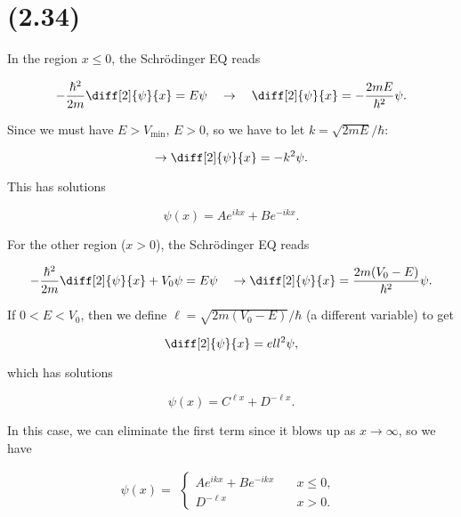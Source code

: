 \section{(2.34)}

\begin{parts}

\item In the region $x\leq0$, the Schr\"odinger EQ reads

\begin{equation*}
    -\frac{\hbar^2}{2m}\diff[2]{\psi}{x} = E\psi \quad \rightarrow \quad \diff[2]{\psi}{x} = -\frac{2mE}{\hbar^2}\psi.
\end{equation*}

Since we must have $E > V_{\mathrm{min}}$, $E>0$, so we have to let $k = \sqrt{2mE}/\hbar$:

\begin{equation*}
    \rightarrow \diff[2]{\psi}{x} = -k^2\psi.
\end{equation*}

This has solutions

\begin{equation}
    \psi(x) = Ae^{ikx} + Be^{-ikx}.
\end{equation}

For the other region ($x>0$), the Schr\"odinger EQ reads

\begin{equation*}
    -\frac{\hbar^2}{2m}\diff[2]{\psi}{x} + V_0\psi = E\psi \quad \rightarrow \diff[2]{\psi}{x} = \frac{2m(V_0 - E)}{\hbar^2}\psi.
\end{equation*}

If $0<E<V_0$, then we define $\ell = \sqrt{2m(V_0 - E)}/\hbar$ (a different variable) to get

\begin{equation*}
    \diff[2]{\psi}{x} = ell^2\psi,
\end{equation*}

which has solutions

\begin{equation}
    \psi(x) = C^{\ell x} + D^{-\ell x}.
\end{equation}

In this case, we can eliminate the first term since it blows up as $x \rightarrow \infty$, so we have

\begin{equation}
    \psi(x) = 
        \begin{alignedat}{1}
        \begin{cases}
            Ae^{ikx} + Be^{-ikx} \quad & x\leq0, \\
            D^{-\ell x} & x>0.
        \end{cases}
        \end{alignedat}
\end{equation}


\end{parts}
